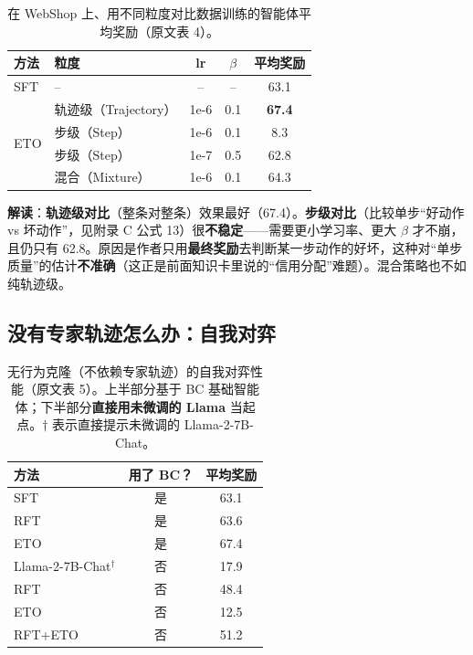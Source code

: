 \documentclass[11pt,UTF8,fontset=fandol]{ctexart}
\begin{document}
\begin{table}[H]\centering
\caption{在 WebShop 上、用不同粒度对比数据训练的智能体平均奖励（原文表 4）。}
\label{tab:gran}
\begin{tabular}{llccc}
\toprule
方法 & 粒度 & lr & $\beta$ & 平均奖励 \\
\midrule
SFT & -- & -- & -- & 63.1 \\
\midrule
\multirow{4}{*}{ETO} & 轨迹级（Trajectory） & 1e-6 & 0.1 & \textbf{67.4} \\
                     & 步级（Step）        & 1e-6 & 0.1 & 8.3 \\
                     & 步级（Step）        & 1e-7 & 0.5 & 62.8 \\
                     & 混合（Mixture）     & 1e-6 & 0.1 & 64.3 \\
\bottomrule
\end{tabular}
\end{table}

\textbf{解读}：\textbf{轨迹级对比}（整条对整条）效果最好（67.4）。\textbf{步级对比}（比较单步“好动作 vs 坏动作”，见附录 C 公式 13）很\textbf{不稳定}——需要更小学习率、更大 $\beta$ 才不崩，且仍只有 62.8。原因是作者只用\textbf{最终奖励}去判断某一步动作的好坏，这种对“单步质量”的估计\textbf{不准确}（这正是前面知识卡里说的“信用分配”难题）。混合策略也不如纯轨迹级。

\subsection{没有专家轨迹怎么办：自我对弈}

\begin{table}[H]\centering
\caption{无行为克隆（不依赖专家轨迹）的自我对弈性能（原文表 5）。上半部分基于 BC 基础智能体；下半部分\textbf{直接用未微调的 Llama} 当起点。$\dagger$ 表示直接提示未微调的 Llama-2-7B-Chat。}
\label{tab:selfplay}
\begin{tabular}{lcc}
\toprule
方法 & 用了 BC？ & 平均奖励 \\
\midrule
SFT & 是 & 63.1 \\
RFT & 是 & 63.6 \\
ETO & 是 & 67.4 \\
\midrule
Llama-2-7B-Chat$^\dagger$ & 否 & 17.9 \\
RFT     & 否 & 48.4 \\
ETO     & 否 & 12.5 \\
RFT+ETO & 否 & 51.2 \\
\bottomrule
\end{tabular}
\end{table}
\end{document}
